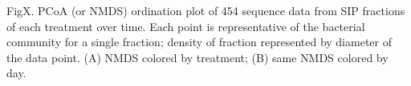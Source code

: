 FigX. PCoA (or NMDS) ordination plot of 454 sequence data from SIP fractions of each treatment over time. Each point is representative of the bacterial community for a single fraction; density of fraction represented by diameter of the data point. (A) NMDS colored by treatment; (B) same NMDS colored by day.